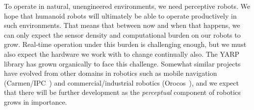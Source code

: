 
To operate in natural, unengineered environments, we need perceptive
robots.  We hope that humanoid robots will ultimately be able to
operate productively in such environments.  That means that between
now and when that happens, we can only expect the sensor density and
computational burden on our robots to grow.  Real-time operation under
this burden is challenging enough, but we must also expect the
hardware we work with to change continually also.  The YARP library
has grown organically to face this challenge.
%
%
Somewhat similar projects have evolved from other domains in robotics
such as mobile navigation (Carmen/IPC~\cite{roy03IROS}) and
commercial/industrial robotics (Orocos~\cite{soetens05orocos}),
and we expect that there will be further development as the
{\em perceptual} component of robotics grows in importance.